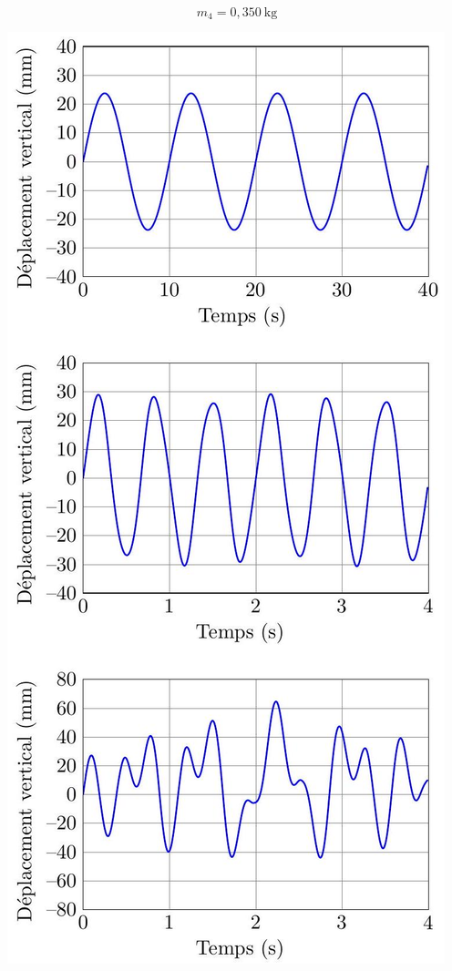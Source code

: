 \documentclass[10pt]{article}
\begin{document}
$$
m_{4}=0,350 \mathrm{~kg}
$$

\begin{center}
\includegraphics[max width=\textwidth]{2022_12_31_ed674c1a831ea1bff3a0g-07}
\end{center}
\end{document}
